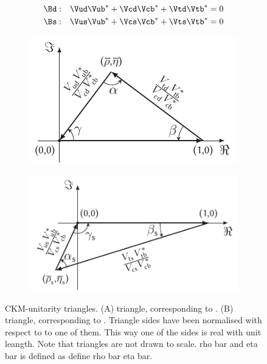 \begin{subequations}
  \label{unitConstraints}
  \begin{align}
    \Bd : & \quad \Vud\Vub^* + \Vcd\Vcb^* + \Vtd\Vtb^* = 0
    \label{unitConstraints_Bd} \\
    \Bs : & \quad \Vus\Vub^* + \Vcs\Vcb^* + \Vts\Vtb^* = 0
    \label{unitConstraints_Bs}
  \end{align}
\end{subequations}

\begin{figure}[h]
  \centering
  \begin{subfigure}{0.475\textwidth}
    \raggedright
    \includegraphics[width=\textwidth]{Figures/Chapter1/b-d-triangle}
    \caption{}
    \label{unitTriangles_bd}
  \end{subfigure}%
  \begin{subfigure}{0.525\textwidth}
    \raggedleft
    \includegraphics[width=\textwidth]{Figures/Chapter1/b-s-triangle}
    \caption{}
    \label{unitTriangles_bs}
  \end{subfigure}
  \caption{CKM-unitarity triangles. (A) \Bd triangle, corresponding to . (B) \Bs triangle,
           corresponding to . Triangle sides have been normalised with respect to to one of them.
           This way one of the sides is real with unit leangth. Note that triangles are not drawn to scale.
           rho bar and eta bar is defined as {\color{red} define rho bar eta bar}.  }
  \label{unitTriangles}
\end{figure}

